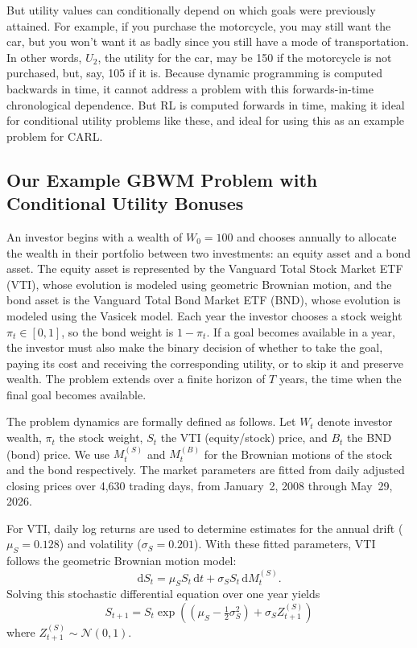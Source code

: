 \documentclass[mnsc,sglanonrev]{informs4}
\begin{document}
But utility values can conditionally depend on which goals were previously attained. For example, if you purchase the motorcycle, you may still want the car, but you won't want it as badly since you still have a mode of transportation. In other words, $U_2$, the utility for the car, may be 150 if the motorcycle is not purchased, but, say, 105 if it is. Because dynamic programming is computed backwards in time, it cannot address a problem with this forwards-in-time chronological dependence. But RL is computed forwards in time, making it ideal for conditional utility problems like these, and ideal for using this as an example problem for CARL.


\subsection{Our Example GBWM Problem with Conditional Utility Bonuses}
\label{sec:gbwm-demo}

An investor begins with a wealth of $W_0=100$ and chooses annually to allocate the wealth in their portfolio between two investments: an equity asset and a bond asset. The equity asset is represented by the Vanguard Total Stock Market ETF (VTI), whose evolution is modeled using geometric Brownian motion, and the bond asset is the Vanguard Total Bond Market ETF (BND), whose evolution is modeled using the Vasicek model. Each year the investor chooses a stock weight $\pi_t\in[0,1]$, so the bond weight is $1-\pi_t$. If a goal becomes available in a year, the investor must also make the binary decision of whether to take the goal, paying its cost and receiving the corresponding utility, or to skip it and preserve wealth. The problem extends over a finite horizon of $T$ years, the time when the final goal becomes available. 

The problem dynamics are formally defined as follows. Let $W_t$ denote investor
wealth, $\pi_t$ the stock weight, $S_t$ the VTI (equity/stock) price, and
$B_t$ the BND (bond) price. We use $M^{(S)}_t$ and $M^{(B)}_t$
for the Brownian motions of the stock and the bond respectively. The market
parameters are fitted from daily adjusted closing prices over 4,630 trading days,
from January~2, 2008 through May~29, 2026. 

For VTI, daily log returns are
used to determine estimates for the annual drift ($\mu_S=0.128$) and volatility ($\sigma_S=0.201$). With these fitted parameters, VTI follows the geometric Brownian motion model:
\[
  \mathrm{d}S_t = \mu_S S_t\,\mathrm{d}t + \sigma_S S_t\,\mathrm{d}M^{(S)}_t.
\]
Solving this stochastic differential equation over one year yields
\[
  S_{t+1}=S_t\exp\!\left((\mu_S-\tfrac12\sigma_S^2)+\sigma_S Z^{(S)}_{t+1}\right)
\]
where $Z^{(S)}_{t+1}\sim\mathcal{N}(0,1)$.
\end{document}
